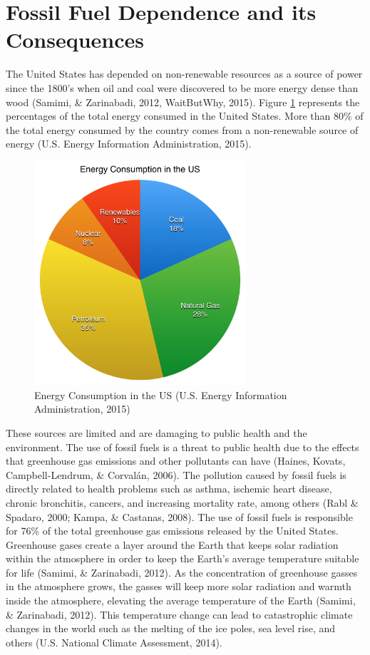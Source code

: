   \section {Fossil Fuel Dependence and its Consequences}
  \par The United States has depended on non-renewable resources as a source of power since the 1800's when oil and coal were discovered to be more energy dense than wood (Samimi, \& Zarinabadi, 2012, WaitButWhy, 2015). Figure \ref{fig:pie} represents the percentages of the total energy consumed in the United States. More than 80\% of the total energy consumed by the country comes from a non-renewable source of energy (U.S. Energy Information Administration, 2015).
  \begin{figure}[h]
    \centering
      \includegraphics[width=0.70\textwidth]{images/01-EnergyConsuptionPieChart}
    \caption{Energy Consumption in the US (U.S. Energy Information Administration, 2015)}
    \label{fig:pie}
  \end{figure}
  \par These sources are limited and are damaging to public health and the environment. The use of fossil fuels is a threat to public health due to the effects that greenhouse gas emissions and other pollutants can have (Haines, Kovats, Campbell-Lendrum, \& Corvalán, 2006).  The pollution caused by fossil fuels is directly related to health problems such as asthma, ischemic heart disease, chronic bronchitis, cancers, and increasing mortality rate, among others (Rabl \& Spadaro, 2000; Kampa, \& Castanas, 2008). The use of fossil fuels is responsible for 76\% of the total greenhouse gas emissions released by the United States. Greenhouse gases create a layer around the Earth that keeps solar radiation within the atmosphere in order to keep the Earth's average temperature suitable for life (Samimi, \& Zarinabadi, 2012).  As the concentration of greenhouse gasses in the atmosphere grows, the gasses will keep more solar radiation and warmth inside the atmosphere, elevating the average temperature of the Earth (Samimi, \& Zarinabadi, 2012). This temperature change can lead to catastrophic climate changes in the world such as the melting of the ice poles, sea level rise, and others (U.S. National Climate Assessment, 2014).
